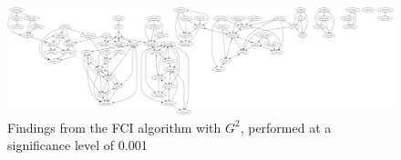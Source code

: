 \begin{figure}[ht]
    \centering
    \includegraphics[scale=0.1]{Report/final_report/pictures/FCI_gsq_0.001_all_UA_78_famdec.png}
    \caption{Findings from the FCI algorithm with $G^2$, performed at a significance level of 0.001}
    \label{fig:fci_gsq_0.001all_UA_78_famdec}
\end{figure}
